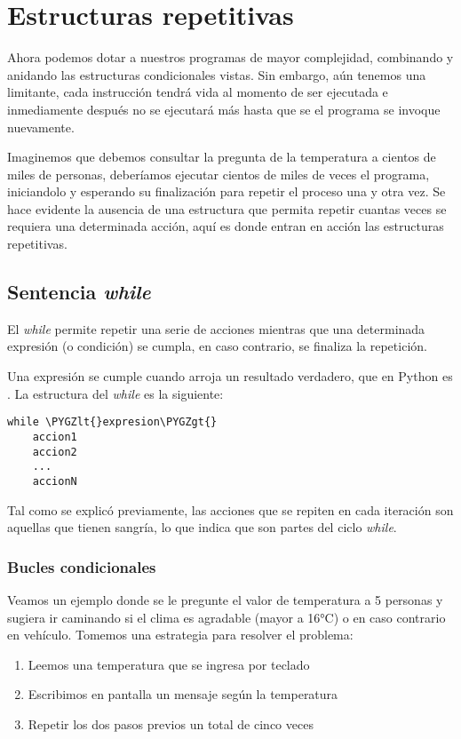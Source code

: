 \documentclass[a4paper,12pt,spanish]{sphinxmanual}
\def\PYGZlt{\char`\<}
\def\PYGZgt{\char`\>}
\begin{document}
\section{Estructuras repetitivas}
\label{Unidad03:estructuras-repetitivas}
Ahora podemos dotar a nuestros programas de mayor complejidad,
combinando y anidando las estructuras condicionales vistas. Sin embargo,
aún tenemos una limitante, cada instrucción tendrá vida al momento de
ser ejecutada e inmediamente después no se ejecutará más hasta que se el
programa se invoque nuevamente.

Imaginemos que debemos consultar la pregunta de la temperatura a cientos
de miles de personas, deberíamos ejecutar cientos de miles de veces el
programa, iniciandolo y esperando su finalización para repetir el
proceso una y otra vez. Se hace evidente la ausencia de una estructura
que permita repetir cuantas veces se requiera una determinada acción,
aquí es donde entran en acción las estructuras repetitivas.


\subsection{Sentencia \emph{while}}
\label{Unidad03:sentencia-while}
El \emph{while} permite repetir una serie de acciones mientras que una
determinada expresión (o condición) se cumpla, en caso contrario, se
finaliza la repetición.

Una expresión se cumple cuando arroja un resultado verdadero, que en
Python es . La estructura del \emph{while} es la siguiente:

\begin{Verbatim}[commandchars=\\\{\}]
while \PYGZlt{}expresion\PYGZgt{}
    accion1
    accion2
    ...
    accionN
\end{Verbatim}

Tal como se explicó previamente, las acciones que se repiten en cada
iteración son aquellas que tienen sangría, lo que indica que son partes
del ciclo \emph{while}.


\subsubsection{Bucles condicionales}
\label{Unidad03:bucles-condicionales}
Veamos un ejemplo donde se le pregunte el valor de temperatura a 5
personas y sugiera ir caminando si el clima es agradable (mayor a 16°C)
o en caso contrario en vehículo. Tomemos una estrategia para resolver el
problema:
\begin{enumerate}
\item {} 
Leemos una temperatura que se ingresa por teclado

\item {} 
Escribimos en pantalla un mensaje según la temperatura

\item {} 
Repetir los dos pasos previos un total de cinco veces

\end{enumerate}
\end{document}
